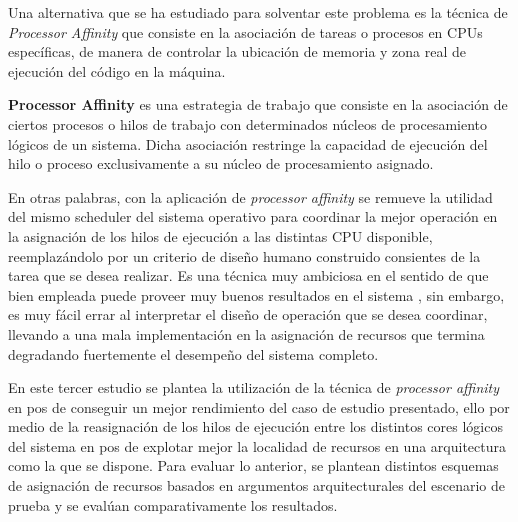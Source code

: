 Una alternativa que se ha estudiado para solventar este problema es la técnica de \emph{Processor Affinity} que consiste en la asociación de tareas o procesos en CPUs específicas, de manera de controlar la ubicación de memoria y zona real de ejecución del código en la máquina.
\begin{defn} \textbf{Processor Affinity} es una estrategia de trabajo que consiste en la asociación de ciertos procesos o hilos de trabajo con determinados núcleos de procesamiento lógicos de un sistema. Dicha asociación restringe la capacidad de ejecución del hilo o proceso exclusivamente a su núcleo de procesamiento asignado.
\end{defn}
En otras palabras, con la aplicación de \emph{processor affinity} se remueve la utilidad del mismo scheduler del sistema operativo para coordinar la mejor operación en la asignación de los hilos de ejecución a las distintas CPU disponible, reemplazándolo por un criterio de diseño humano construido consientes de la tarea que se desea realizar. Es una técnica muy ambiciosa en el sentido de que bien empleada puede proveer muy buenos resultados en el sistema \cite{paper:cacheaffinity}, sin embargo, es muy fácil errar al interpretar el diseño de operación que se desea coordinar, llevando a una mala implementación en la asignación de recursos que termina degradando fuertemente el desempeño del sistema completo.

En este tercer estudio se plantea la utilización de la técnica de \emph{processor affinity} en pos de conseguir un mejor rendimiento del caso de estudio presentado, ello por medio de la reasignación de los hilos de ejecución entre los distintos cores lógicos del sistema en pos de explotar mejor la localidad de recursos en una arquitectura como la que se dispone. Para evaluar lo anterior, se plantean distintos esquemas de asignación de recursos basados en argumentos arquitecturales del escenario de prueba y se evalúan comparativamente los resultados.

